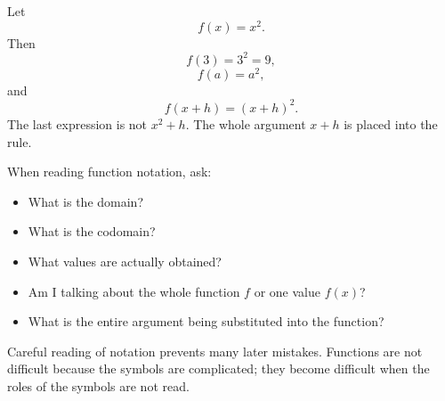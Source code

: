 \begin{examplebox}
Let
\[
f(x)=x^2.
\]
Then
\[
f(3)=3^2=9,
\]
\[
f(a)=a^2,
\]
and
\[
f(x+h)=(x+h)^2.
\]
The last expression is not \(x^2+h\). The whole argument \(x+h\) is placed into the rule.
\end{examplebox}

\begin{summarybox}
When reading function notation, ask:
\begin{itemize}
\item What is the domain?
\item What is the codomain?
\item What values are actually obtained?
\item Am I talking about the whole function \(f\) or one value \(f(x)\)?
\item What is the entire argument being substituted into the function?
\end{itemize}
\end{summarybox}

Careful reading of notation prevents many later mistakes. Functions are not difficult because the symbols are complicated; they become difficult when the roles of the symbols are not read.